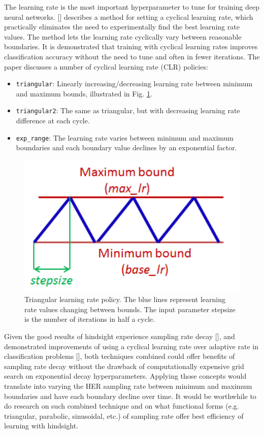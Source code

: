 \documentclass[conference]{IEEEtran}
\begin{document}
The learning rate is the most important hyperparameter to tune for training deep neural networks. [\cite{smith2017cyclical}] describes a method for setting a cyclical learning rate, which practically eliminates the need to experimentally find the best learning rate values. The method lets the learning rate cyclically vary between reasonable boundaries. It is demonstrated that training with cyclical learning rates improves classification accuracy without the need to tune and often in fewer iterations. The paper discusses a number of cyclical learning rate (CLR) policies:
\begin{itemize}
    \item \texttt{triangular}: Linearly increasing/decreasing learning rate between minimum and maximum bounds, illustrated in Fig. \ref{fig:research_clr}.
    \item \texttt{triangular2}: The same as triangular, but with decreasing learning rate difference at each cycle.
    \item \texttt{exp\_range}: The learning rate varies between minimum and maximum boundaries and each boundary value declines by an exponential factor.
\end{itemize}
\begin{figure}[ht]
\centering
\includegraphics[width=0.7\columnwidth]{img/CLR.png}
\caption{Triangular learning rate policy. The blue lines represent learning rate values changing between bounds. The input parameter stepsize is the number of iterations in half a cycle.}
\label{fig:research_clr}
\end{figure}

Given the good results of hindsight experience sampling rate decay [\cite{vecchietti2020sampling}], and demonstrated improvements of using a cyclical learning rate over adaptive rate in classification problems [\cite{smith2017cyclical}], both techniques combined could offer benefits of sampling rate decay without the drawback of computationally expensive grid search on exponential decay hyperparameters. Applying those concepts would translate into varying the HER sampling rate between minimum and maximum boundaries and have each boundary decline over time. It would be worthwhile to do research on such combined technique and on what functional forms (e.g. triangular, parabolic, sinusoidal, etc.) of sampling rate offer best efficiency of learning with hindsight.
\end{document}
